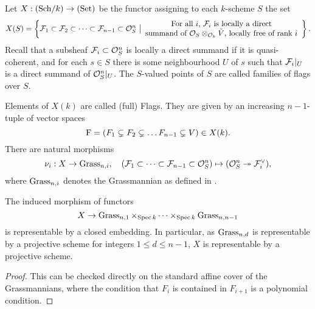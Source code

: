\documentclass[../main.tex]{subfiles}
\begin{document}
\begin{defi}\label{def:FlagVariety}
  Let $X: {(\mathrm{Sch}/{k})} \to {(\mathrm{Set})}$ be the functor assigning to each $k$-scheme $S$
  the set 
  \begin{equation*}
    X(S) = \left\{\cF_1 \subset \cF_2 \subset \dots \subset \cF_{n-1} \subset
    \cO_S^n \ \big \vert  \begin{array}c
      \text{For all $i$, $\cF_i$ is locally a direct} \\
      \text{summand of $\cO_S \otimes_{\cO_k} \tilde V$, locally free of rank $i$}
  \end{array} \right\}.
  \end{equation*}
  Recall that a subsheaf $\mathcal{F}_i \subset \mathcal{O}_S^n$ is locally a direct summand
  if it is quasi-coherent, and for each $s \in S$ there is some neighbourhood 
  $U$ of $s$ such that $\mathcal{F}_i|_U$ is a direct summand of $\mathcal{O}_S^n|_U$. 
  The $S$-valued points of $S$ are called families of flags over $S$.
\end{defi}
Elements of $X(k)$ are called (full) Flags. They are given by an increasing
$n-1$-tuple of vector spaces 
$$\mathrm{F} = (F_1 \subsetneq F_2 \subsetneq \dots F_{n-1} \subsetneq V) \in X(k).$$
  There are natural morphisms
  \begin{equation*}
    \nu_i: X \to \operatorname{Grass}_{n,i}, \quad (\mathcal{F}_1 \subset \dots \subset \mathcal{F}_{n-1}
    \subset \mathcal{O}_S^n) \mapsto (\mathcal{O}_S^n \twoheadrightarrow \mathcal{F}_i^\vee),
  \end{equation*}
  where $\operatorname{Grass}_{n,i}$ denotes the Grassmannian as defined in
  \cite[\href{https://stacks.math.columbia.edu/tag/089R}{Tag 089R}]{stacks-project}.  

\begin{prop}\label{prop:FlagVarisProjective}
  The induced morphism of functors
  \begin{equation*}
    X \to \operatorname{Grass}_{n,1} \times_{\operatorname{Spec} k} \dots \times_{\operatorname{Spec} k} \operatorname{Grass}_{n,n-1}
  \end{equation*}
  is representable by a closed embedding. In particular, as $\operatorname{Grass}_{n,d}$ is
  representable by a projective scheme for integers $1 \leq d \leq n-1$, 
  $X$ is representable by a projective scheme. 
\begin{proof}
  This can be checked directly on the standard affine cover of the Grassmannians,
  where the condition that $F_i$ is contained in $F_{i+1}$ is a polynomial
  condition.
\end{proof}
\end{prop}
\end{document}
